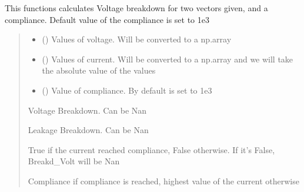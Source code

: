 \documentclass[letterpaper,10pt,english]{sphinxmanual}
\begin{document}
\begin{fulllineitems}
\label{\detokenize{VBD:VBD.calculate_breakdown}}
\pysigstartsignatures
{}
\pysigstopsignatures
\sphinxAtStartPar
This functions calculates Voltage breakdown for two vectors given, and a compliance. Default value of the compliance is set to 1e\sphinxhyphen{}3
\begin{quote}\begin{description}
\begin{itemize}
\item {} 
\sphinxAtStartPar
{} () \textendash{} Values of voltage. Will be converted to a np.array

\item {} 
\sphinxAtStartPar
{} () \textendash{} Values of current. Will be converted to a np.array and we will take the absolute value of the values

\item {} 
\sphinxAtStartPar
{} () \textendash{} Value of compliance. By default is set to 1e\sphinxhyphen{}3

\end{itemize}

\sphinxAtStartPar
Voltage Breakdown. Can be Nan

\sphinxAtStartPar
Leakage Breakdown. Can be Nan

\sphinxAtStartPar
True if the current reached compliance, False otherwise. If it’s False, Breakd\_Volt will be Nan

\sphinxAtStartPar
Compliance if compliance is reached, highest value of the current otherwise

\end{description}\end{quote}

\end{fulllineitems}
\end{document}
